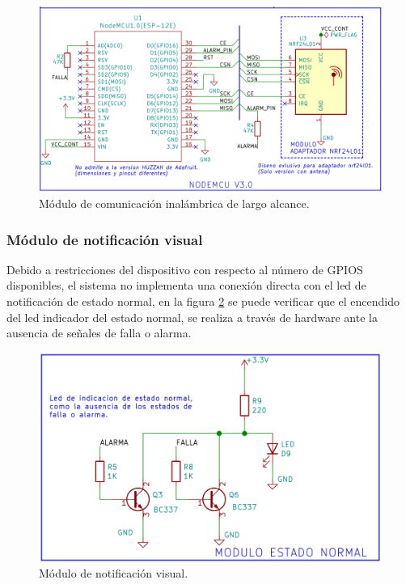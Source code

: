 \begin{figure}[]
	\centering
	\includegraphics[scale=.25]{./Figures/Capitulo3/Fig_J3.png}
	\caption{Módulo de comunicación inalámbrica de largo alcance.}
	\label{fig:figura_j3}
\end{figure} 


\subsubsection{Módulo de notificación visual}

Debido a restricciones del dispositivo con respecto al número de GPIOS disponibles, el sistema no implementa una conexión directa con el led de notificación de estado normal, en la figura \ref{fig:figura_k3} se puede verificar que el encendido del led indicador del estado normal, se realiza a través de hardware ante la ausencia de señales de falla o alarma.

\begin{figure}[]
	\centering
	\includegraphics[scale=.25]{./Figures/Capitulo3/Fig_K3.png}
	\caption{Módulo de notificación visual.}
	\label{fig:figura_k3}
\end{figure} 



